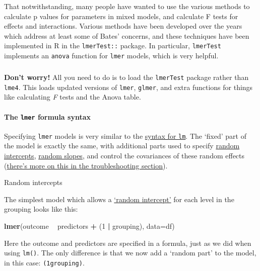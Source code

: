\documentclass[]{article}
\newenvironment{Shaded}{\begin{snugshade}}{\end{snugshade}}
\newcommand{\KeywordTok}[1]{\textcolor[rgb]{0.13,0.29,0.53}{\textbf{#1}}}
\newcommand{\DataTypeTok}[1]{\textcolor[rgb]{0.13,0.29,0.53}{#1}}
\newcommand{\DecValTok}[1]{\textcolor[rgb]{0.00,0.00,0.81}{#1}}
\newcommand{\StringTok}[1]{\textcolor[rgb]{0.31,0.60,0.02}{#1}}
\newcommand{\OperatorTok}[1]{\textcolor[rgb]{0.81,0.36,0.00}{\textbf{#1}}}
\newcommand{\NormalTok}[1]{#1}
\let\oldparagraph\paragraph
\renewcommand{\paragraph}[1]{\oldparagraph{#1}\mbox{}}
\let\oldsubparagraph\subparagraph
\renewcommand{\subparagraph}[1]{\oldsubparagraph{#1}\mbox{}}
\theoremstyle{definition}
\theoremstyle{definition}
\theoremstyle{definition}
\theoremstyle{remark}
\begin{document}
That notwithstanding, many people have wanted to use the various methods
to calculate p values for parameters in mixed models, and calculate F
tests for effects and interactions. Various methods have been developed
over the years which address at least some of Bates' concerns, and these
techniques have been implemented in R in the \texttt{lmerTest::}
package. In particular, \texttt{lmerTest} implements an \texttt{anova}
function for \texttt{lmer} models, which is very helpful.

\subparagraph{}\label{section-18}

\textbf{Don't worry!} All you need to do is to load the
\texttt{lmerTest} package rather than \texttt{lme4}. This loads updated
versions of \texttt{lmer}, \texttt{glmer}, and extra functions for
things like calculating \emph{F} tests and the Anova table.

\paragraph{\texorpdfstring{The \texttt{lmer} formula
syntax}{The lmer formula syntax}}\label{lmer-syntax}

Specifying \texttt{lmer} models is very similar to the
\protect\hyperlink{formulae}{syntax for \texttt{lm}}. The `fixed' part
of the model is exactly the same, with additional parts used to specify
\protect\hyperlink{random-intercepts}{random intercepts},
\protect\hyperlink{random-slopes}{random slopes}, and control the
covariances of these random effects
(\protect\hyperlink{controlling-lmer-covariances}{there's more on this
in the troubleshooting section}).

Random intercepts

The simplest model which allows a
\protect\hyperlink{random-intercepts}{`random intercept'} for each level
in the grouping looks like this:

\begin{Shaded}
\begin{Highlighting}[]
\KeywordTok{lmer}\NormalTok{(outcome }\OperatorTok{~}\StringTok{ }\NormalTok{predictors }\OperatorTok{+}\StringTok{ }\NormalTok{(}\DecValTok{1} \OperatorTok{|}\StringTok{ }\NormalTok{grouping), }\DataTypeTok{data=}\NormalTok{df)}
\end{Highlighting}
\end{Shaded}

Here the outcome and predictors are specified in a formula, just as we
did when using \texttt{lm()}. The only difference is that we now add a
`random part' to the model, in this case:
\texttt{(1\textbar{}grouping)}.
\end{document}
